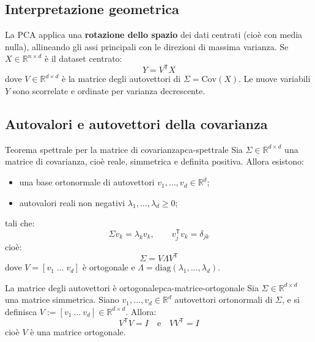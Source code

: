 \subsection{Interpretazione geometrica}

La PCA applica una \textbf{rotazione dello spazio} dei dati centrati (cioè con
media nulla), allineando gli assi principali con le direzioni di massima
varianza. Se \( X \in \mathbb{R}^{n \times d} \) è il dataset centrato:
\[
Y = V^\mathsf{T} X
\]
dove \( V \in \mathbb{R}^{d \times d} \) è la matrice degli autovettori di \(
\Sigma = \mathrm{Cov}(X) \). Le nuove variabili \( Y \) sono scorrelate e
ordinate per varianza decrescente.

\subsection{Autovalori e autovettori della covarianza}

\begin{teorema}{Teorema spettrale per la matrice di covarianza}{pca-spettrale}
Sia \( \Sigma \in \mathbb{R}^{d \times d} \) una matrice di covarianza, cioè
reale, simmetrica e definita positiva. Allora esistono:
\begin{itemize}
  \item una base ortonormale di autovettori \( v_1, \dots, v_d \in \mathbb{R}^d
  \);
  \item autovalori reali non negativi \( \lambda_1, \dots, \lambda_d \geq 0 \);
\end{itemize}
tali che:
\[
\Sigma v_k = \lambda_k v_k, \qquad v_j^\mathsf{T} v_k = \delta_{jk}
\]
cioè:
\[
\Sigma = V \Lambda V^\mathsf{T}
\]
dove \( V = [v_1 \; \dots \; v_d] \) è ortogonale e \( \Lambda =
\mathrm{diag}(\lambda_1, \dots, \lambda_d) \).
\end{teorema}

\begin{proposizione}{La matrice degli autovettori è
ortogonale}{pca-matrice-ortogonale}
Sia \( \Sigma \in \mathbb{R}^{d \times d} \) una matrice simmetrica. Siano \(
v_1, \dots, v_d \in \mathbb{R}^d \) autovettori ortonormali di \( \Sigma \), e
si definisca \( V := [v_1 \ \dots \ v_d] \in \mathbb{R}^{d \times d} \). Allora:
\[
V^\mathsf{T} V = I \quad \text{e} \quad VV^\mathsf{T} = I
\]
cioè \( V \) è una matrice ortogonale.
\end{proposizione}

